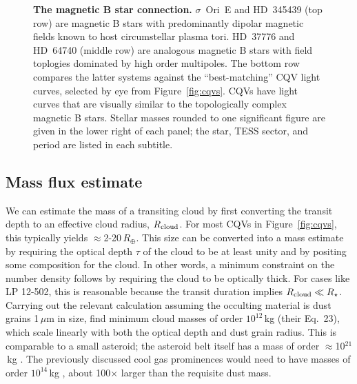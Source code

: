 \documentclass[11pt,twocolumn,tighten]{aastex63}
\begin{document}
\begin{figure}[!th]
	\begin{center}
		\centering
			
		\vspace{-0.4cm}

		\vspace{-0.4cm}

		\vspace{-0.1cm}
		\caption{
      {\bf The magnetic B star connection.}
      $\sigma$~Ori~E and HD~345439 (top row) are magnetic B stars with
      predominantly dipolar magnetic fields known to host
      circumstellar plasma tori.  HD~37776 and HD~64740 (middle row)
      are analogous magnetic B stars with field toplogies dominated
      by high order multipoles.  The bottom row compares the latter
      systems against the ``best-matching'' CQV light curves, selected
      by eye from Figure~\ref{fig:cqvs}.  CQVs have light curves that are
      visually similar to the topologically complex magnetic B stars.
      Stellar masses rounded to one significant figure are given in
      the lower right of each panel; the star, TESS sector, and period
      are listed in each subtitle.
		}
		\label{fig:bstar}
	\end{center}
\end{figure}


\subsection{Mass flux estimate}
\label{subsec:massflux}

We can estimate the mass of a transiting cloud by first converting the
transit depth to an effective cloud radius, $R_{\rm cloud}$.  For most
CQVs in Figure~\ref{fig:cqvs}, this typically yields
$\approx$2-20\,$R_\oplus$.  This size can be converted into a mass
estimate by requiring the optical depth $\tau$ of the cloud to be at
least unity and by positing some composition for the cloud.  In other
words, a minimum constraint on the number density follows by requiring
the cloud to be optically thick.  For cases like LP 12-502, this is
reasonable because the transit duration implies $R_{\rm cloud}\ll
R_\star$.  Carrying out the relevant calculation assuming the
occulting material is dust grains 1\,$\mu$m in size,
\citet{2023MNRAS.518.4734S} find minimum cloud masses of order
$10^{12}$\,kg (their Eq.~23), which scale linearly with both the
optical depth and dust grain radius.  This is comparable to a small
asteroid; the asteroid belt itself has a mass of order
$\approx$10$^{21}$\,kg \citep{2019Icar..319..812P}.  The previously
discussed cool gas prominences would need to have masses of order
$10^{14}$\,kg \citep{1990MNRAS.247..415C}, about 100$\times$ larger
than the requisite dust mass.
\end{document}
